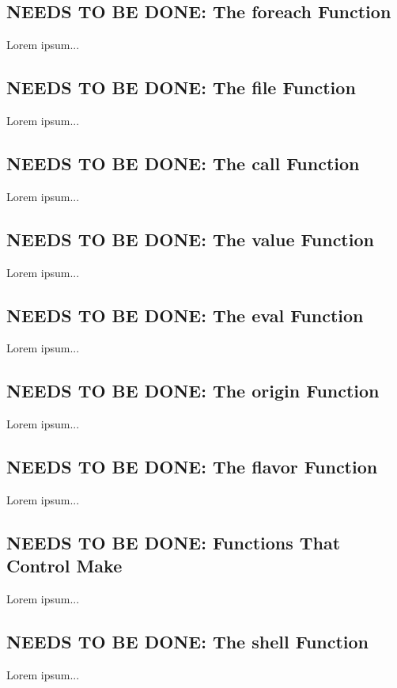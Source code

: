 \documentclass{charun}
\begin{document}
\begin{multicols*}{2}
\color{gray}
\subsection{NEEDS TO BE DONE: The foreach Function}
Lorem ipsum...
\color{black}

\color{gray}
\subsection{NEEDS TO BE DONE: The file Function}
Lorem ipsum...
\color{black}

\color{gray}
\subsection{NEEDS TO BE DONE: The call Function}
Lorem ipsum...
\color{black}

\color{gray}
\subsection{NEEDS TO BE DONE: The value Function}
Lorem ipsum...
\color{black}

\color{gray}
\subsection{NEEDS TO BE DONE: The eval Function}
Lorem ipsum...
\color{black}

\color{gray}
\subsection{NEEDS TO BE DONE: The origin Function}
Lorem ipsum...
\color{black}

\color{gray}
\subsection{NEEDS TO BE DONE: The flavor Function}
Lorem ipsum...
\color{black}

\color{gray}
\subsection{NEEDS TO BE DONE: Functions That Control Make}
Lorem ipsum...
\color{black}

\color{gray}
\subsection{NEEDS TO BE DONE: The shell Function}
Lorem ipsum...
\color{black}


\end{multicols*}
\end{document}
